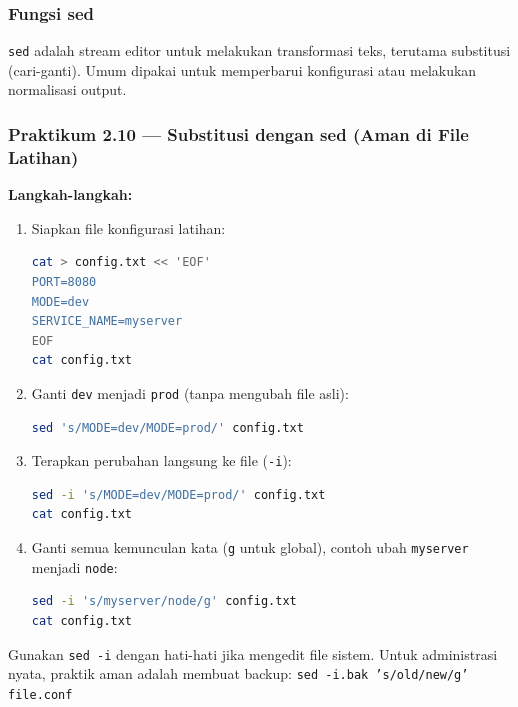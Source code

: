 \subsubsection*{Fungsi sed}
\texttt{sed} adalah stream editor untuk melakukan transformasi teks, terutama substitusi (cari-ganti).
Umum dipakai untuk memperbarui konfigurasi atau melakukan normalisasi output.

\subsubsection*{Praktikum 2.10 --- Substitusi dengan sed (Aman di File Latihan)}
\textbf{Langkah-langkah:}
\begin{enumerate}
    \item Siapkan file konfigurasi latihan:
\begin{lstlisting}[language=bash, caption={Membuat file config latihan}]
cat > config.txt << 'EOF'
PORT=8080
MODE=dev
SERVICE_NAME=myserver
EOF
cat config.txt
\end{lstlisting}

    \item Ganti \texttt{dev} menjadi \texttt{prod} (tanpa mengubah file asli):
\begin{lstlisting}[language=bash, caption={sed substitusi tanpa in-place}]
sed 's/MODE=dev/MODE=prod/' config.txt
\end{lstlisting}

    \item Terapkan perubahan langsung ke file (\texttt{-i}):
\begin{lstlisting}[language=bash, caption={sed in-place}]
sed -i 's/MODE=dev/MODE=prod/' config.txt
cat config.txt
\end{lstlisting}

    \item Ganti semua kemunculan kata (\texttt{g} untuk global), contoh ubah \texttt{myserver} menjadi \texttt{node}:
\begin{lstlisting}[language=bash, caption={sed global replacement}]
sed -i 's/myserver/node/g' config.txt
cat config.txt
\end{lstlisting}
\end{enumerate}

\begin{warningbox}
Gunakan \texttt{sed -i} dengan hati-hati jika mengedit file sistem. Untuk administrasi nyata, praktik aman adalah membuat backup:
\texttt{sed -i.bak 's/old/new/g' file.conf}
\end{warningbox}

